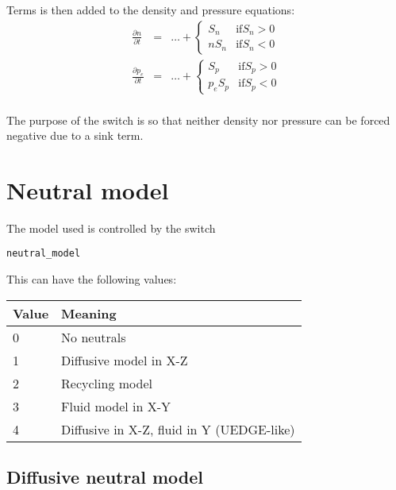 \documentclass[12pt,a4paper]{article}
\begin{document}
Terms is then added to the density and pressure equations:
\begin{eqnarray}
  \frac{\partial n}{\partial t} &=& \ldots + \left\{\begin{array}{cc}
  S_n & \mathrm{if} S_n > 0 \\
  n S_n & \mathrm{if} S_n < 0
  \end{array}\right. \\
  \frac{\partial p_e}{\partial t} &=& \ldots + \left\{\begin{array}{cc}
  S_p & \mathrm{if} S_p > 0 \\
  p_e S_p & \mathrm{if} S_p < 0
  \end{array}\right. \\
\end{eqnarray}

The purpose of the switch is so that neither density nor pressure can be forced negative due to a sink term.

\section{Neutral model}
\label{sec:neutrals}

The model used is controlled by the switch

\begin{verbatim}
neutral_model
\end{verbatim}

This can have the following values:

\begin{tabular}{ll}
Value & Meaning \\
\hline
\hline
0 & No neutrals \\
1 & Diffusive model in X-Z \\
2 & Recycling model \\
3 & Fluid model in X-Y \\
4 & Diffusive in X-Z, fluid in Y (UEDGE-like) \\
\hline
\hline
\end{tabular}

\subsection{Diffusive neutral model}
\end{document}
